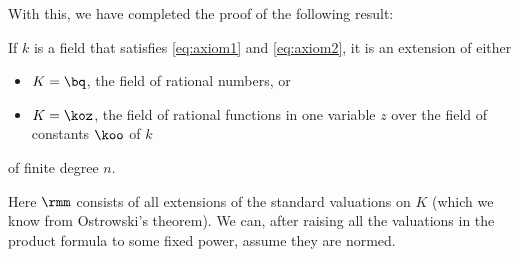 With this, we have completed the proof of the following result:

\begin{thm}
  If $k$ is a field that satisfies \ref{eq:axiom1} and \ref{eq:axiom2}, it is an
  extension of either
  \begin{itemize}
  \item $K = \bq$, the field of rational numbers, or
  \item $K = \koz$, the field of rational functions in one variable $z$ over the
    field of constants $\koo$ of $k$
  \end{itemize}
  of finite degree $n$.



\end{thm}

Here $\rmm$ consists of all extensions of the standard valuations on $K$ (which we
know from Ostrowski's theorem). We can, after raising all the valuations in the
product formula to some fixed power, assume they are normed.

